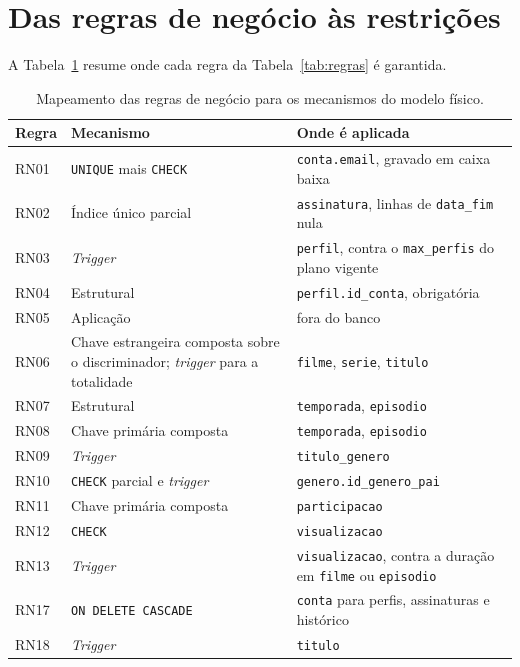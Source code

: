 \documentclass[a4paper,12pt,oneside,openany]{book}
\newcommand{\bd}[1]{\texttt{#1}}
\begin{document}
\section{Das regras de negócio às restrições}\label{sec:rn-constraint}

A Tabela~\ref{tab:rn-constraint} resume onde cada regra da
Tabela~\ref{tab:regras} é garantida.

\begin{table}[ht]
\centering
\caption{Mapeamento das regras de negócio para os mecanismos do modelo físico.}
\label{tab:rn-constraint}
\begin{tabularx}{0.98\textwidth}{p{} p{} X}
\toprule
\textbf{Regra} & \textbf{Mecanismo} & \textbf{Onde é aplicada} \\
\midrule
RN01 & \bd{UNIQUE} mais \bd{CHECK} & \bd{conta.email}, gravado em caixa baixa \\
RN02 & Índice único parcial & \bd{assinatura}, linhas de \bd{data\_fim} nula \\
RN03 & \textit{Trigger} & \bd{perfil}, contra o \bd{max\_perfis} do plano vigente \\
RN04 & Estrutural & \bd{perfil.id\_conta}, obrigatória \\
RN05 & Aplicação & fora do banco \\
RN06 & Chave estrangeira composta sobre o discriminador; \textit{trigger} para a totalidade & \bd{filme}, \bd{serie}, \bd{titulo} \\
RN07 & Estrutural & \bd{temporada}, \bd{episodio} \\
RN08 & Chave primária composta & \bd{temporada}, \bd{episodio} \\
RN09 & \textit{Trigger} & \bd{titulo\_genero} \\
RN10 & \bd{CHECK} parcial e \textit{trigger} & \bd{genero.id\_genero\_pai} \\
RN11 & Chave primária composta & \bd{participacao} \\
RN12 & \bd{CHECK} & \bd{visualizacao} \\
RN13 & \textit{Trigger} & \bd{visualizacao}, contra a duração em \bd{filme} ou \bd{episodio} \\
RN17 & \bd{ON DELETE CASCADE} & \bd{conta} para perfis, assinaturas e histórico \\
RN18 & \textit{Trigger} & \bd{titulo} \\
\bottomrule
\end{tabularx}
\end{table}
\end{document}
